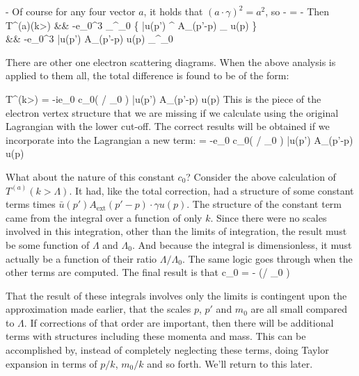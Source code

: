 \beq
	 \approx -
\eeq
Of course for any four vector $a$, it holds that $(a \cdot \gamma)^2 = a^2$, so
\beq
	- = - 
\eeq
Then
\beqa
T^{(a)}(k>\Lambda) 
	&\approx&  -e_0^3 \int_{\Lambda}^{\Lambda_0}    \left\{
			\bar{u}(p') \gamma^\mu {} A_{}(p'-p) \cdot \gamma {} \gamma_\mu
		u(p) \right\}	\\
	&\approx&	-e_0^3 \bar{u}(p')  A_{}(p'-p) \cdot \gamma u(p) 
				\int_{\Lambda}^{\Lambda_0}    
\eeqa
	
There are other one electron scattering diagrams.  When the above analysis is applied to them all, the total difference is found to be of the form:

\beq
T^(k>\Lambda) = -ie_0 c_0( \Lambda / \Lambda_0 ) \bar{u}(p')  A_{}(p'-p) \cdot \gamma u(p) 
\eeq	
This is the piece of the electron vertex structure that we are missing if we calculate using the original Lagrangian with the lower cut-off.  The correct results will be obtained if we incorporate into the Lagrangian a new term:
\beq
	\delta {} = -e_0 c_0( \Lambda / \Lambda_0 ) \bar{u}(p')  A_{}(p'-p) \cdot \gamma u(p) 
\eeq

What about the nature of this constant $c_0$?  Consider the above calculation of $T^{(a)}(k>\Lambda)$.  It had, like the total correction, had a structure of some constant terms times $ \bar{u}(p')  A_{\text{ext}}(p'-p) \cdot \gamma u(p) $.  The structure of the constant term came from the integral over a function of only $k$.  Since there were no scales involved in this integration, other than the limits of integration, the result must be some function of $\Lambda$ and $\Lambda_0$.  And because the integral is dimensionless, it must actually be a function of their ratio $\Lambda / \Lambda_0$.  The same logic goes through when the other terms are computed.  The final result is that
\beq
	c_0 =  -  \log(\Lambda / \Lambda_0 )
\eeq


That the result of these integrals involves only the limits is contingent upon the approximation made earlier, that the scales $p$, $p'$ and $m_0$ are all small compared to $\Lambda$.  If corrections of that order are important, then there will be additional terms with structures including these momenta and mass.  This can be accomplished by, instead of completely neglecting these terms, doing Taylor expansion in terms of $p/k$, $m_0/k$ and so forth.  We'll return to this later. %

